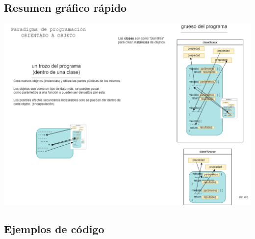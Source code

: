 \documentclass[spanish,12pt,a4paper,final,oneside]{book}
\begin{document}
\subsection*{Resumen gráfico rápido}
\includegraphics[width=\textwidth]{Paradigma de programacion - ORIENTADO A OBJETO}



\subsection*{Ejemplos de código}
\end{document}
